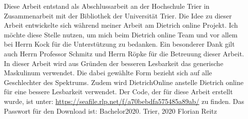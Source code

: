 \preface

Diese Arbeit entstand als Abschlussarbeit an der Hochschule Trier in Zusammenarbeit mit der Bibliothek der Universität Trier. 
\newline
\newline
Die Idee zu dieser Arbeit entwickelte sich während meiner Arbeit am Dietrich online Projekt. Ich möchte diese Stelle nutzen, um mich beim Dietrich online Team und vor allem bei Herrn Kock für die Unterstützung zu bedanken.
\newline
\newline
Ein besonderer Dank gilt auch Herrn Professor Schmitz und Herrn Röpke für die Betreuung dieser Arbeit.
\newline
\newline
In dieser Arbeit wird aus Gründen der besseren Lesbarkeit das generische Maskulinum verwendet. Die dabei gewählte Form bezieht sich auf alle Geschlechter des Spektrums. 
\newline
Zudem wird DietrichOnline anstelle Dietrich online für eine bessere Lesbarkeit verwendet.
\newline
\newline
Der Code, der für diese Arbeit erstellt wurde, ist unter: \url{https://seafile.rlp.net/f/a70bebdfa575485a89ab/} zu finden. Das Passwort für den Download ist: Bachelor2020.
\newline
\newline
Trier, 2020
\newline
\noindent Florian Reitz